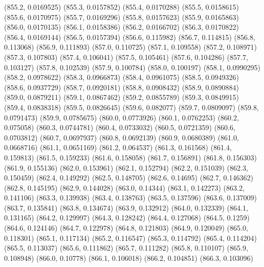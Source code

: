 {					(855.2, 0.0169525)
					(855.3, 0.0157852)
					(855.4, 0.0170288)
					(855.5, 0.0158615)
					(855.6, 0.0170975)
					(855.7, 0.0169296)
					(855.8, 0.0157623)
					(855.9, 0.0165863)
					(856.0, 0.0170135)
					(856.1, 0.0158386)
					(856.2, 0.0166702)
					(856.3, 0.0170822)
					(856.4, 0.0169144)
					(856.5, 0.0157394)
					(856.6, 0.115982)
					(856.7, 0.114815)
					(856.8, 0.113068)
					(856.9, 0.111893)
					(857.0, 0.110725)
					(857.1, 0.109558)
					(857.2, 0.108971)
					(857.3, 0.107803)
					(857.4, 0.106041)
					(857.5, 0.105461)
					(857.6, 0.104286)
					(857.7, 0.103127)
					(857.8, 0.102539)
					(857.9, 0.100784)
					(858.0, 0.100197)
					(858.1, 0.0990295)
					(858.2, 0.0978622)
					(858.3, 0.0966873)
					(858.4, 0.0961075)
					(858.5, 0.0949326)
					(858.6, 0.0937729)
					(858.7, 0.0920181)
					(858.8, 0.0908432)
					(858.9, 0.0890884)
					(859.0, 0.0879211)
					(859.1, 0.0867462)
					(859.2, 0.0855789)
					(859.3, 0.0849915)
					(859.4, 0.0838318)
					(859.5, 0.0826645)
					(859.6, 0.082077)
					(859.7, 0.0809097)
					(859.8, 0.0791473)
					(859.9, 0.0785675)
					(860.0, 0.0773926)
					(860.1, 0.0762253)
					(860.2, 0.075058)
					(860.3, 0.0744781)
					(860.4, 0.0733032)
					(860.5, 0.0721359)
					(860.6, 0.0703812)
					(860.7, 0.0697937)
					(860.8, 0.0692139)
					(860.9, 0.0680389)
					(861.0, 0.0668716)
					(861.1, 0.0651169)
					(861.2, 0.064537)
					(861.3, 0.161568)
					(861.4, 0.159813)
					(861.5, 0.159233)
					(861.6, 0.158058)
					(861.7, 0.156891)
					(861.8, 0.156303)
					(861.9, 0.155136)
					(862.0, 0.153961)
					(862.1, 0.152794)
					(862.2, 0.151039)
					(862.3, 0.150459)
					(862.4, 0.149292)
					(862.5, 0.148705)
					(862.6, 0.14695)
					(862.7, 0.146362)
					(862.8, 0.145195)
					(862.9, 0.144028)
					(863.0, 0.14344)
					(863.1, 0.142273)
					(863.2, 0.141106)
					(863.3, 0.139938)
					(863.4, 0.138763)
					(863.5, 0.137596)
					(863.6, 0.137009)
					(863.7, 0.135841)
					(863.8, 0.134674)
					(863.9, 0.132912)
					(864.0, 0.132339)
					(864.1, 0.131165)
					(864.2, 0.129997)
					(864.3, 0.128242)
					(864.4, 0.127068)
					(864.5, 0.1259)
					(864.6, 0.124146)
					(864.7, 0.122978)
					(864.8, 0.121803)
					(864.9, 0.120049)
					(865.0, 0.118301)
					(865.1, 0.117134)
					(865.2, 0.116547)
					(865.3, 0.114792)
					(865.4, 0.114204)
					(865.5, 0.113037)
					(865.6, 0.111862)
					(865.7, 0.111282)
					(865.8, 0.110107)
					(865.9, 0.108948)
					(866.0, 0.10778)
					(866.1, 0.106018)
					(866.2, 0.104851)
					(866.3, 0.103096)
}

